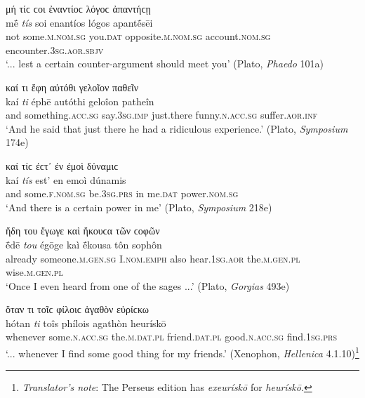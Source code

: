 \begin{exe}
\ex μή τίϲ ϲοι ἐναντίοϲ λόγοϲ ἀπαντήϲῃ\\
\gll mḗ \emph{tís} soi enantíos lógos apantḗsēi\\
not some.\textsc{m.nom.sg} you.\textsc{dat} opposite.\textsc{m.nom.sg} account.\textsc{nom.sg} encounter.\textsc{3sg.aor.sbjv}\\
\trans `... lest a certain counter-argument should meet you' (Plato, \textit{Phaedo} 101a)
\label{tis25}
\end{exe}

\begin{exe}
\ex καί τι ἔφη αὐτόθι γελοῖον παθεῖν\\
\gll kaí \emph{ti} éphē autóthi geloîon patheîn\\
and something.\textsc{acc.sg} say.\textsc{3sg.imp} just.there funny.\textsc{n.acc.sg} suffer.\textsc{aor.inf}\\
\trans `And he said that just there he had a ridiculous experience.' (Plato, \textit{Symposium} 174e)
\label{tis26}
\end{exe}

\begin{exe}
\ex καί τίϲ ἐϲτ᾽ ἐν ἐμοὶ δύναμιϲ\\
\gll kaí \emph{tís} est' en emoì dúnamis\\
and some.\textsc{f.nom.sg} be.\textsc{3sg.prs} in me.\textsc{dat} power.\textsc{nom.sg}\\
\trans `And there is a certain power in me' (Plato, \textit{Symposium} 218e)
\label{tis27}
\end{exe}

\begin{exe}
\ex ἤδη του ἔγωγε καὶ ἤκουϲα τῶν ϲοφῶν\\
\gll ḗdē \emph{tou} égōge kaì ḗkousa tôn sophôn\\
already someone.\textsc{m.gen.sg} I.\textsc{nom.emph} also hear.\textsc{1sg.aor} the.\textsc{m.gen.pl} wise.\textsc{m.gen.pl}\\
\trans `Once I even heard from one of the sages ...' (Plato, \textit{Gorgias} 493e)
\label{tis28}
\end{exe}

\begin{exe}
\ex ὅταν τι τοῖϲ φίλοιϲ ἀγαθὸν εὑρίϲκω\\
\gll hótan \emph{ti} toîs phílois agathòn heurískō\\
whenever some.\textsc{n.acc.sg} the.\textsc{m.dat.pl} friend.\textsc{dat.pl} good.\textsc{n.acc.sg} find.\textsc{1sg.prs}\\
\trans `... whenever I find some good thing for my friends.' (Xenophon, \textit{Hellenica} 4.1.10)\footnote{\emph{Translator's note}: The Perseus edition has \textit{exeurískō} for \textit{heurískō}.}
\label{tis29}
\end{exe}

